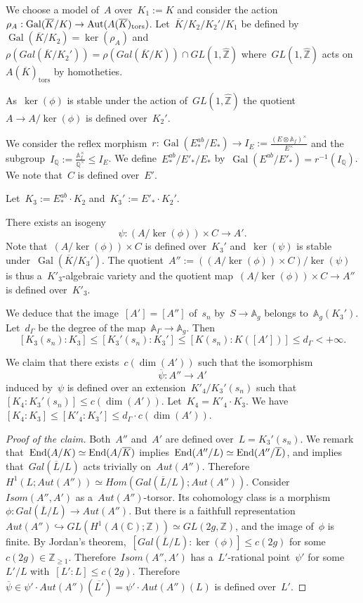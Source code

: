 \documentclass[12pt]{amsart}
\newcommand{\End}{{\rm End}}
\newcommand{\Aut}{{\rm Aut}}
\newcommand{\Gal}{{\rm Gal}}
\newcommand{\tors}{{\text{tors}}}
\newcommand{\Z}{{\mathbb Z}}
\newcommand{\Q}{{\mathbb Q}}
\newcommand{\C}{{\mathbb C}}
\newcommand{\A}{{\mathbb A}}
\renewcommand{\Gal}{{\operatorname{Gal}}}
\newcommand{\ol}{\overline}
\newcommand{\wh}{\widehat}
\newcommand{\tens}{\otimes}
\begin{document}
We choose a model of~$A$ over~$K_1:=K$ and consider the action~$\rho_A:\Gal(\ol{K}/K)\to \Aut(A(\ol{K})_{\tors})$. 
Let~$\ol{K}/K_2/K_2'/K_1$ be defined by~$\Gal(\ol{K}/K_2)=\ker(\rho_A)$
and~$\rho(Gal(\ol{K}/K_2'))=\rho(Gal(\ol{K}/K))\cap GL(1,\wh{\Z})$ where~$GL(1,\wh{\Z})$ acts on~$A(\ol{K})_{\tors}$ by homotheties. 

As~$\ker(\phi)$ is stable under the action of~$GL(1,\wh{\Z})$ the quotient~$A\to A/\ker(\phi)$ is defined over~$K_2'$.


We consider the reflex morphism~$r:\Gal(E_*^{ab}/E_*)\to I_E:=\frac{(E\tens \A_f)^\times}{E^\times}$ and the subgroup~$I_\Q:=\frac{\A_f^\times}{\Q^\times}\leq I_E$. We define~$E_*^{ab}/E'_*/E_*$ by~$\Gal(E^{ab}/E'_*)=r^{-1}(I_\Q)$. We note that~$C$ is defined over~$E'$.


Let~$K_3:=E_*^{ab}\cdot K_2$ and~$K_3':=E'_*\cdot K_2'$.

There exists an isogeny
\[
\psi:(A/\ker(\phi))\times C\to A'.
\]
Note that~$(A/\ker(\phi))\times C$ is defined over~$K_3'$ and~$\ker(\psi)$ is stable under~$\Gal(\ol{K}/K_3')$. 
The quotient~$A'':=((A/\ker(\phi))\times C)/\ker(\psi)$ is thus a~$K'_3$-algebraic variety and the quotient map~$(A/\ker(\phi))\times C\to A''$ is defined over~$K'_3$.

We deduce that the image~$[A']=[A'']$ of~$s_n$ by~$S\to \mathbb{A}_g$ belongs to~$\mathbb{A}_g(K_3')$.
Let~$d_\Gamma$ be the degree of the map~$\mathbb{A}_\Gamma\to\mathbb{A}_g$. Then
\[
[K_3(s_n):K_3]\leq [K_3'(s_n):K_3']\leq 
[K(s_n):K([A'])]\leq d_\Gamma<+\infty.
\]

We claim that there exists~$c(\dim(A'))$ such that the isomorphism
\begin{equation}\label{eq:ol psi}
\ol{\psi}:A''\to A'
\end{equation}
induced by~$\psi$ is defined over an extension~$K'_4/K_3'(s_n)$ such that~$[K_4:K_3'(s_n)]\leq c(\dim(A'))$. Let~$K_4=K'_4\cdot K_3$. We have~$[K_4:K_3]\leq [K'_4:K_3']\leq d_\Gamma\cdot c(\dim(A'))$.
\begin{proof}[Proof of the claim]
 Both~$A''$ and~$A'$ are defined over~$L=K_3'(s_n)$. We remark that~$\End(A/K)\simeq \End(A/\ol{K})$ implies~$\End(A''/L)\simeq \End(A''/\ol{L})$, and implies that~$Gal(\ol{L}/L)$ acts trivially on~$Aut(A'')$. Therefore~$H^1(L;Aut(A''))\simeq Hom(Gal(\ol{L}/L);Aut(A''))$. Consider~$Isom(A'',A')$ as a~$Aut(A'')$-torsor. Its cohomology class is a morphism~$\phi:Gal(\ol{L}/L)\to Aut(A'')$. But there is a faithfull representation~$Aut(A'')\hookrightarrow GL(H^1(A(\C);\Z))\simeq GL(2g,\Z)$, and the image of~$\phi$ is finite. By Jordan's theorem,~$[Gal(\ol{L}/L):\ker(\phi)]\leq c(2g)$ for some~$c(2g)\in\Z_{\geq1}$. Therefore~$Isom(A'',A')$ has a~$L'$-rational point~$\psi'$ for some~$L'/L$ with~$[L':L]\leq c(2g)$. Therefore~$\ol{\psi}\in\psi'\cdot Aut(A'')(\ol{L'})=\psi'\cdot Aut(A'')(L)$ is defined over~$L'$.
\end{proof}
\end{document}
